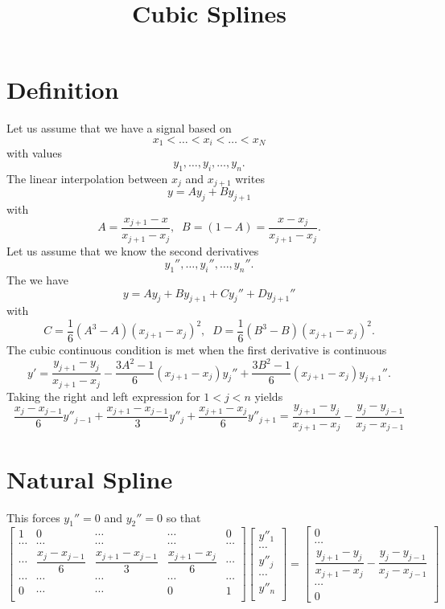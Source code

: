 \documentclass[aps]{revtex4}
\begin{document}
\title{Cubic Splines}
\maketitle

\section{Definition}
Let us assume that we have a signal based on 
$$x_1<\ldots < x_i < \ldots<x_N$$
with values 
$$y_1,\ldots,y_i,\ldots,y_n.$$
The linear interpolation between $x_j$ and $x_{j+1}$ writes
$$
	y = A y_{j} + B y_{j+1}
$$
with
$$
	A = \dfrac{x_{j+1}-x}{x_{j+1}-x_{j}},\;\;
	B = (1-A) = \dfrac{x-x_{j}}{x_{j+1}-x_{j}}.
$$
Let us assume that we know the second derivatives
$$
	y_1'',\ldots,y_i'',\ldots,y_n''.
$$
The we have
$$
	y = A y_{j} + B y_{j+1} + C y_j'' + D y_{j+1}''
$$
with
$$
	C = \dfrac{1}{6}\left(A^3-A\right)\left(x_{j+1}-x_{j}\right)^2,\;\;D=\dfrac{1}{6}\left(B^3-B\right)\left(x_{j+1}-x_{j}\right)^2.
$$
The cubic continuous condition is met when the first derivative is continuous
$$
	y' = \dfrac{y_{j+1}-y_{j}}{x_{j+1}-x_{j}} - \dfrac{3A^2-1}{6}\left(x_{j+1}-x_{j}\right)y_j'' +
	\dfrac{3B^2-1}{6}\left(x_{j+1}-x_{j}\right)y_{j+1}''.
$$
Taking the right and left expression for $1<j<n$ yields
$$
	\dfrac{x_{j}-x_{j-1}}{6} y''_{j-1} + \dfrac{x_{j+1}-x_{j-1}}{3} y''_j + \dfrac{x_{j+1}-x_{j}}{6} y''_{j+1} = 
	\dfrac{y_{j+1}-y_{j}}{x_{j+1}-x_{j}} - \dfrac{y_j-y_{j-1}}{x_j-x_{j-1}}
$$
\section{Natural Spline}
This forces $y_1''=0$ and $y_2''=0$ so that
$$
	\begin{bmatrix}
		1 & 0 & \cdots & \cdots & 0 \\
		\cdots & \cdots & \cdots & \cdots & \cdots \\
		\cdots & \dfrac{x_{j}-x_{j-1}}{6} & \dfrac{x_{j+1}-x_{j-1}}{3} & \dfrac{x_{j+1}-x_{j}}{6} & \cdots\\
		\cdots & \cdots & \cdots & \cdots & \cdots \\
		0 & \cdots & \cdots & 0 & 1 \\
	\end{bmatrix}
	\begin{bmatrix}
	y''_1\\
	\cdots\\
	y''_j\\
	\cdots\\
	y''_n\\
	\end{bmatrix}
	=
	\begin{bmatrix}
	0\\
	\cdots\\
	\dfrac{y_{j+1}-y_{j}}{x_{j+1}-x_{j}} - \dfrac{y_j-y_{j-1}}{x_j-x_{j-1}}\\
	\cdots\\
	0
	\end{bmatrix}
$$
\end{document}
